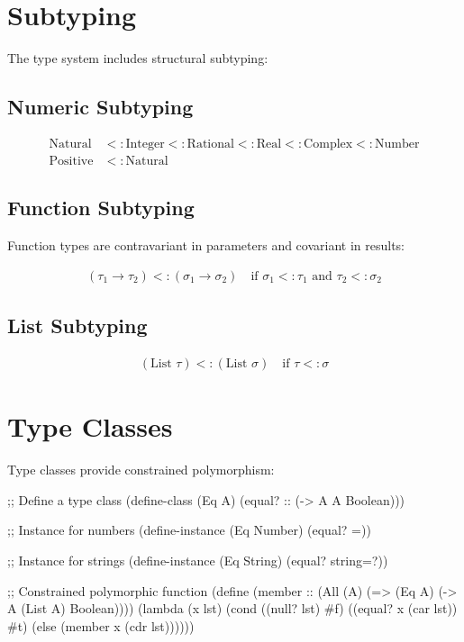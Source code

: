 \section{Subtyping}
\label{sec:subtyping}


The type system includes structural subtyping:

\subsection{Numeric Subtyping}
\label{subsec:numeric-subtyping}

\begin{align}
\text{Natural} &<: \text{Integer} <: \text{Rational} <: \text{Real} <: \text{Complex} <: \text{Number} \\
\text{Positive} &<: \text{Natural}
\end{align}

\subsection{Function Subtyping}
\label{subsec:function-subtyping}

Function types are contravariant in parameters and covariant in results:

\begin{align}
(\tau_1 \to \tau_2) <: (\sigma_1 \to \sigma_2) \quad \text{if } \sigma_1 <: \tau_1 \text{ and } \tau_2 <: \sigma_2
\end{align}

\subsection{List Subtyping}
\label{subsec:list-subtyping}

\begin{align}
(\text{List } \tau) <: (\text{List } \sigma) \quad \text{if } \tau <: \sigma
\end{align}

\section{Type Classes}
\label{sec:type-classes}


Type classes provide constrained polymorphism:

\begin{example}
\begin{lambdustcode}
;; Define a type class
(define-class (Eq A)
  (equal? :: (-> A A Boolean)))

;; Instance for numbers
(define-instance (Eq Number)
  (equal? =))

;; Instance for strings  
(define-instance (Eq String)
  (equal? string=?))

;; Constrained polymorphic function
(define (member :: (All (A) (=> (Eq A) (-> A (List A) Boolean))))
  (lambda (x lst)
    (cond ((null? lst) #f)
          ((equal? x (car lst)) #t)
          (else (member x (cdr lst))))))
\end{lambdustcode}
\end{example}

